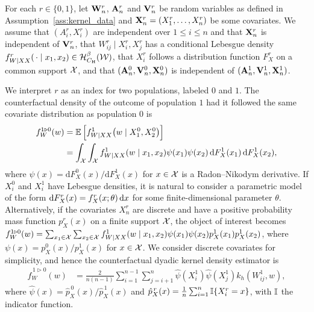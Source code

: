For each $r \in \{0,1\}$,
let $\mathbf{W}_n^r$, $\mathbf{A}_n^r$ and $\mathbf{V}_n^r$ be random variables
as defined in Assumption~\ref{ass:kernel_data} and
$\mathbf{X}_n^r = (X_1^r, \ldots, X_n^r)$ be some covariates.
We assume that $(A_i^r, X_i^r)$ are
independent over $1 \leq i \leq n$
and that $\mathbf{X}_n^r$ is independent of $\mathbf{V}_n^r$,
that $W_{i j}^r \mid X_i^r, X_j^r$
has a conditional Lebesgue density
$f_{W \mid XX}^r(\,\cdot \mid x_1, x_2) \in \mathcal{H}^\beta_{C_\mathrm{H}}(\mathcal{W})$,
that $X_i^r$ follows a distribution function $F_X^r$
on a common support $\mathcal{X}$, and that
$(\mathbf{A}_n^0, \mathbf{V}_n^0, \mathbf{X}_n^0)$
is independent of $(\mathbf{A}_n^1, \mathbf{V}_n^1, \mathbf{X}_n^1)$.

We interpret $r$ as an index for two populations,
labeled $0$ and $1$.
The counterfactual density of the outcome of
population $1$ had it followed the same covariate distribution
as population $0$ is
%
\begin{align*}
  f_W^{1 \triangleright 0}(w)
  &=
  \mathbb{E}\left[
    f_{W \mid XX}^1\big(w \mid X_1^0, X_2^0\big)
  \right] \\
  &=
  \int_{\mathcal{X}}
  \int_{\mathcal{X}}
  f_{W \mid XX}^{1}(w \mid x_1, x_2)
  \psi(x_1)
  \psi(x_2)
  \,\mathrm{d}F_X^{1}(x_1)
  \,\mathrm{d}F_X^{1}(x_2),
\end{align*}
%
where $\psi(x) = \mathrm{d} F_X^0(x) / \mathrm{d} F_X^1(x)$ for $x \in \mathcal{X}$
is a Radon--Nikodym derivative.
If $X^0_i$ and $X^1_i$ have Lebesgue densities,
it is natural to consider a parametric model of the form
$\mathrm{d} F_X^{r}(x)=f_X^r(x;\theta)\,\mathrm{d}x$
for some finite-dimensional parameter $\theta$.
Alternatively, if the covariates $X_n^r$ are discrete and have a positive
probability mass function $p_X^r(x)$ on a finite
support $\mathcal{X}$, the object of interest becomes
$f_W^{1 \triangleright 0}(w)
= \sum_{x_1 \in \mathcal{X}} \sum_{x_2 \in \mathcal{X}}
f_{W \mid XX}^{1}(w \mid x_1, x_2) \psi(x_1) \psi(x_2)
p_X^{1}(x_1) p_X^{1}(x_2)$,
where $\psi(x) = p_X^0(x)/p_X^1(x)$ for $x \in \mathcal{X}$.
We consider discrete covariates for simplicity,
and hence the counterfactual dyadic kernel density estimator is
%
\begin{align*}
  \hat f_W^{\,1 \triangleright 0}(w)
  &=
  \frac{2}{n(n-1)}
  \sum_{i=1}^{n-1}
  \sum_{j=i+1}^n
  \hat \psi(X_i^1)
  \hat \psi(X_j^1)
  k_h(W_{i j}^1, w),
\end{align*}
%
where $\hat\psi(x) = \hat p_X^{\,0}(x) / \hat p_X^{\,1}(x)$ and
$\hat p_X^{\,r}(x) = \frac{1}{n}\sum_{i = 1}^n \mathbb{I}\{X_i^r = x\}$,
with $\mathbb{I}$ the indicator function.

